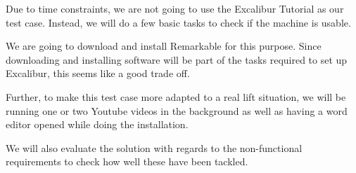 Due to time constraints, we are not going to use the Excalibur
Tutorial as our test case. Instead, we will do a few basic tasks to
check if the machine is usable.

We are going to download and install Remarkable for this purpose.
Since downloading and installing software will be part of the tasks
required to set up Excalibur, this seems like a good trade off.

Further, to make this test case more adapted to a real lift situation,
we will be running one or two Youtube videos in the background as well
as having a word editor opened while doing the installation.

We will also evaluate the solution with regards to the non-functional
requirements to check how well these have been tackled.
